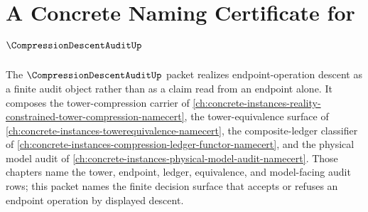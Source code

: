 \chapter{A Concrete Naming Certificate for $\CompressionDescentAuditUp$}
\label{ch:concrete-instances-compression-descent-audit-namecert}

The $\CompressionDescentAuditUp$ packet realizes endpoint-operation descent as a finite audit object rather than as a claim read from an endpoint alone. It composes the tower-compression carrier of \autoref{ch:concrete-instances-reality-constrained-tower-compression-namecert}, the tower-equivalence surface of \autoref{ch:concrete-instances-towerequivalence-namecert}, the composite-ledger classifier of \autoref{ch:concrete-instances-compression-ledger-functor-namecert}, and the physical model audit of \autoref{ch:concrete-instances-physical-model-audit-namecert}. Those chapters name the tower, endpoint, ledger, equivalence, and model-facing audit rows; this packet names the finite decision surface that accepts or refuses an endpoint operation by displayed descent.

